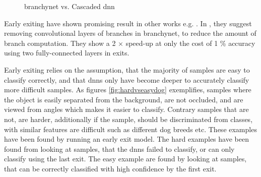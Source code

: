 \begin{figure}
	\hspace{2em}
	\caption[\gls{branchynet} vs. Cascaded \gls{dnn}]{\gls{branchynet} vs. Cascaded \gls{dnn}}
	\label{fig:cascaded-vs-branchy}
\end{figure}

Early exiting have shown promising result in other works e.g. \cite{berestizshevsky_sacrificing_2019,panda_conditional_2016}. In \cite{berestizshevsky_sacrificing_2019}, they suggest removing convolutional layers of branches in \gls{branchynet}, to reduce the amount of branch computation. They show a 2 $ \times $ speed-up at only the cost of 1 \% accuracy using two fully-connected layers in exits.

Early exiting relies on the assumption, that the majority of samples are easy to classify correctly, and that \gls{dnn}s only have become deeper to accurately classify more difficult samples. As figures \ref{fig:hardvseasydog} exemplifies, samples where the object is easily separated from the background, are not occluded, and are viewed from angles which makes it easier to classify. Contrary samples that are not, are harder, additionally if the sample, should be discriminated from classes, with similar features are difficult such as different dog breeds etc. These examples have been found by running an early exit model. The hard examples have been found from looking at samples, that the \gls{dnn}s failed to classify, or can only classify using the last exit. The easy example are found by looking at samples, that can be correctly classified with high confidence by the first exit. 

